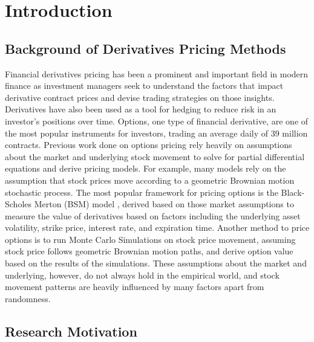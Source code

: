 \chapter{Introduction}

\section{Background of Derivatives Pricing Methods}

Financial derivatives pricing has been a prominent and important field in modern finance as investment managers seek to understand the factors that impact derivative contract prices and devise trading strategies on those insights. Derivatives have also been used as a tool for hedging to reduce risk in an investor's positions over time. Options, one type of financial derivative, are one of the most popular instruments for investors, trading an average daily of 39 million contracts. Previous work done on options pricing rely heavily on assumptions about the market and underlying stock movement to solve for partial differential equations and derive pricing models. For example, many models rely on the assumption that stock prices move according to a geometric Brownian motion stochastic process. The most popular framework for pricing options is the Black-Scholes Merton (BSM) model \cite{black-scholes}, derived based on those market assumptions to measure the value of derivatives based on factors including the underlying asset volatility, strike price, interest rate, and expiration time. Another method to price options is to run Monte Carlo Simulations on stock price movement, assuming stock price follows geometric Brownian motion paths, and derive option value based on the results of the simulations. These assumptions about the market and underlying, however, do not always hold in the empirical world, and stock movement patterns are heavily influenced by many factors apart from randomness.

\section{Research Motivation}

